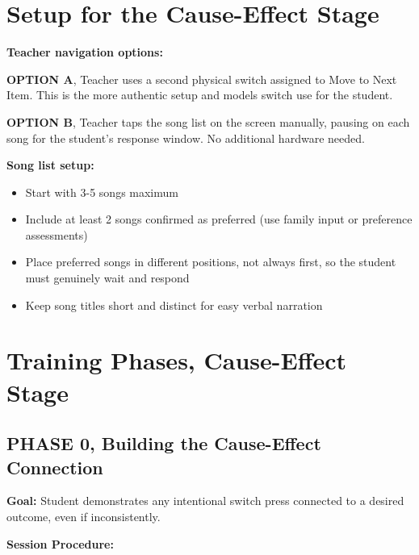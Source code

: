 \documentclass[justified,openright]{tufte-book}
\begin{document}
\section{Setup for the Cause-Effect
Stage}\label{setup-for-the-cause-effect-stage}

\textbf{Teacher navigation options:}


\textbf{OPTION A}, Teacher uses a second physical switch assigned to
Move to Next Item. This is the more authentic setup and models switch
use for the student.

\textbf{OPTION B}, Teacher taps the song list on the screen manually,
pausing on each song for the student's response window. No additional
hardware needed.


\textbf{Song list setup:}
\begin{itemize}

\item Start with 3-5 songs maximum
\item Include at least 2 songs confirmed as preferred (use family input or preference assessments)
\item Place preferred songs in different positions, not always first, so the student must genuinely wait and respond
\item Keep song titles short and distinct for easy verbal narration
\end{itemize}

\section{Training Phases, Cause-Effect
Stage}\label{training-phases-cause-effect-stage}

\subsection{PHASE 0, Building the Cause-Effect
Connection}\label{phase-0-building-the-cause-effect-connection}

\textbf{Goal:} Student demonstrates any intentional switch press
connected to a desired outcome, even if inconsistently.

\textbf{Session Procedure:}
\end{document}
